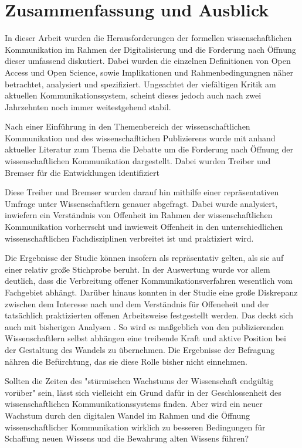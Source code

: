 \chapter{Zusammenfassung und Ausblick}

In dieser Arbeit wurden die Herausforderungen der formellen wissenschaftlichen Kommunikation im Rahmen der Digitalisierung und die Forderung nach Öffnung dieser umfassend diskutiert. Dabei wurden die einzelnen Definitionen von Open Access und Open Science, sowie Implikationen und Rahmenbedingungnen näher betrachtet, analysiert und spezifiziert. Ungeachtet der viefältigen Kritik am aktuellen Kommunikationssystem, scheint dieses jedoch auch nach zwei Jahrzehnten noch immer weitestgehend stabil.

Nach einer Einführung in den Themenbereich der wissenschaftlichen Kommunikation und des wissenschafltichen Publizierens wurde mit anhand aktueller Literatur zum Thema die Debatte um die Forderung nach Öffnung der wissenschaftlichen Kommunikation dargestellt. Dabei wurden Treiber und Bremser für die Entwicklungen identifiziert 

Diese Treiber und Bremser wurden darauf hin mithilfe einer repräsentativen Umfrage unter Wissenschaftlern genauer abgefragt. Dabei wurde analysiert, inwiefern ein Verständnis von Offenheit im Rahmen der wissenschaftlichen Kommunikation vorherrscht und inwieweit Offenheit in den unterschiedlichen wissenschaftlichen Fachdisziplinen verbreitet ist und praktiziert wird.

Die Ergebnisse der Studie können insofern als repräsentativ gelten, als sie auf einer relativ große Stichprobe beruht. In der Auswertung wurde vor allem deutlich, dass die Verbreitung offener Kommunikationsverfahren wesentlich vom Fachgebiet abhängt. Darüber hinaus konnten in der Studie eine große Diskrepanz zwischen dem Interesse nach und dem Verständnis für Offeneheit und der tatsächlich praktizierten offenen Arbeitsweise festgestellt werden. Das deckt sich auch mit bisherigen Analysen \cite{Bartling_2013}. So wird es maßgeblich von den publizierenden Wissenschaftlern selbst abhängen eine treibende Kraft und aktive Position bei der Gestaltung des Wandels zu übernehmen. Die Ergebnisse der Befragung nähren die Befürchtung, das sie diese Rolle bisher nicht einnehmen. 

Sollten die Zeiten des "stürmischen Wachstums der Wissenschaft endgültig vorüber" \cite{K_lbel_2002} sein, lässt sich vielleicht ein Grund dafür in der Geschlossenheit des wissenschaftlichen Kommunikationssystems finden. Aber wird ein neuer Wachstum durch den digitalen Wandel im Rahmen und die Öffnung wissenschaftlicher Kommunikation wirklich zu besseren Bedingungen für Schaffung neuen Wissens und die Bewahrung alten Wissens führen?
